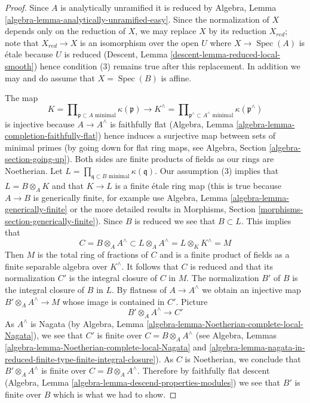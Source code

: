 \documentclass[10pt,a4paper]{amsart}
\theoremstyle{plain}
\theoremstyle{definition}
\theoremstyle{remark}
\numberwithin{equation}{subsection}
\def\Spec{\mathop{\mathrm{Spec}}}
\begin{document}
\begin{proof}
Since $A$ is analytically unramified it is reduced
by Algebra, Lemma \ref{algebra-lemma-analytically-unramified-easy}.
Since the normalization of $X$ depends only on the reduction
of $X$, we may replace $X$ by its reduction $X_{red}$; note
that $X_{red} \to X$ is an isomorphism over the open $U$ where
$X \to \Spec(A)$ is \'etale because $U$ is reduced
(Descent, Lemma \ref{descent-lemma-reduced-local-smooth})
hence condition (3) remains true after this replacement.
In addition we may and do assume that $X = \Spec(B)$ is affine.

\medskip\noindent
The map
$$
K = \prod\nolimits_{\mathfrak p \subset A\text{ minimal}} \kappa(\mathfrak p)
\longrightarrow
K^\wedge = \prod\nolimits_{\mathfrak p^\wedge \subset A^\wedge\text{ minimal}}
\kappa(\mathfrak p^\wedge)
$$
is injective because $A \to A^\wedge$ is faithfully flat
(Algebra, Lemma \ref{algebra-lemma-completion-faithfully-flat})
hence induces a surjective map between sets of minimal primes
(by going down for flat ring maps, see
Algebra, Section \ref{algebra-section-going-up}).
Both sides are finite products of fields as our rings are Noetherian.
Let $L = \prod_{\mathfrak q \subset B\text{ minimal}} \kappa(\mathfrak q)$.
Our assumption (3) implies that $L = B \otimes_A K$ and that
$K \to L$ is a finite \'etale ring map (this is true
because $A \to B$ is generically finite, for example use
Algebra, Lemma \ref{algebra-lemma-generically-finite}
or the more detailed results in Morphisms, Section
\ref{morphisms-section-generically-finite}).
Since $B$ is reduced we see that $B \subset L$.
This implies that
$$
C = B \otimes_A A^\wedge \subset
L \otimes_A A^\wedge = L \otimes_K K^\wedge = M
$$
Then $M$ is the total ring of fractions of $C$ and
is a finite product of fields as a finite separable
algebra over $K^\wedge$. It follows that $C$ is reduced
and that its normalization $C'$ is the integral closure of
$C$ in $M$. The normalization $B'$ of $B$ is the integral
closure of $B$ in $L$. By flatness of $A \to A^\wedge$
we obtain an injective map $B' \otimes_A A^\wedge \to M$ whose
image is contained in $C'$. Picture
$$
B' \otimes_A A^\wedge \longrightarrow C'
$$
As $A^\wedge$ is Nagata (by
Algebra, Lemma \ref{algebra-lemma-Noetherian-complete-local-Nagata}),
we see that $C'$ is finite over
$C = B \otimes_A A^\wedge$ (see
Algebra, Lemmas
\ref{algebra-lemma-Noetherian-complete-local-Nagata} and
\ref{algebra-lemma-nagata-in-reduced-finite-type-finite-integral-closure}).
As $C$ is Noetherian, we conclude that
$B' \otimes_A A^\wedge$ is finite over $C = B \otimes_A A^\wedge$.
Therefore by faithfully flat descent
(Algebra, Lemma \ref{algebra-lemma-descend-properties-modules})
we see that $B'$ is finite over $B$ which is what we had to show.
\end{proof}
\end{document}

